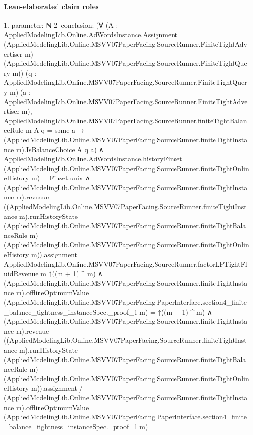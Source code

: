 \documentclass[10pt]{article}
\begin{document}
\paragraph{Lean-elaborated claim roles}\begin{ReviewVerbatim}
1. parameter: ℕ
2. conclusion: (∀
    (A :
      AppliedModelingLib.Online.AdWordsInstance.Assignment
        (AppliedModelingLib.Online.MSVV07PaperFacing.SourceRunner.FiniteTightAdvertiser m)
        (AppliedModelingLib.Online.MSVV07PaperFacing.SourceRunner.FiniteTightQuery m))
    (q : AppliedModelingLib.Online.MSVV07PaperFacing.SourceRunner.FiniteTightQuery m)
    (a : AppliedModelingLib.Online.MSVV07PaperFacing.SourceRunner.FiniteTightAdvertiser m),
    AppliedModelingLib.Online.MSVV07PaperFacing.SourceRunner.finiteTightBalanceRule m A q = some a →
      (AppliedModelingLib.Online.MSVV07PaperFacing.SourceRunner.finiteTightInstance m).IsBalanceChoice A q a) ∧
  AppliedModelingLib.Online.AdWordsInstance.historyFinset
        (AppliedModelingLib.Online.MSVV07PaperFacing.SourceRunner.finiteTightOnlineHistory m) =
      Finset.univ ∧
    (AppliedModelingLib.Online.MSVV07PaperFacing.SourceRunner.finiteTightInstance m).revenue
          ((AppliedModelingLib.Online.MSVV07PaperFacing.SourceRunner.finiteTightInstance m).runHistoryState
              (AppliedModelingLib.Online.MSVV07PaperFacing.SourceRunner.finiteTightBalanceRule m)
              (AppliedModelingLib.Online.MSVV07PaperFacing.SourceRunner.finiteTightOnlineHistory m)).assignment =
        AppliedModelingLib.Online.MSVV07PaperFacing.SourceRunner.factorLPTightFluidRevenue m ↑((m + 1) ^ m) ∧
      (AppliedModelingLib.Online.MSVV07PaperFacing.SourceRunner.finiteTightInstance m).offlineOptimumValue
            (AppliedModelingLib.Online.MSVV07PaperFacing.PaperInterface.section4_finite_balance_tightness_instanceSpec._proof_1
              m) =
          ↑((m + 1) ^ m) ∧
        (AppliedModelingLib.Online.MSVV07PaperFacing.SourceRunner.finiteTightInstance m).revenue
                ((AppliedModelingLib.Online.MSVV07PaperFacing.SourceRunner.finiteTightInstance m).runHistoryState
                    (AppliedModelingLib.Online.MSVV07PaperFacing.SourceRunner.finiteTightBalanceRule m)
                    (AppliedModelingLib.Online.MSVV07PaperFacing.SourceRunner.finiteTightOnlineHistory m)).assignment /
              (AppliedModelingLib.Online.MSVV07PaperFacing.SourceRunner.finiteTightInstance m).offlineOptimumValue
                (AppliedModelingLib.Online.MSVV07PaperFacing.PaperInterface.section4_finite_balance_tightness_instanceSpec._proof_1
                  m) =

\end{ReviewVerbatim}
\end{document}
